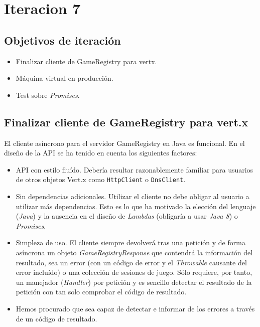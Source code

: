 \chapter{Iteracion 7}
\section{Objetivos de iteración}
\begin{itemize}
 \item Finalizar cliente de GameRegistry para vertx.
 \item Máquina virtual en producción.
 \item Test sobre \emph{Promises}.
\end{itemize}

 
\section{Finalizar cliente de GameRegistry para vert.x}
El cliente asíncrono para el servidor GameRegistry en Java 
es funcional. En el diseño de la API se ha tenido en
cuenta los siguientes factores:

\begin{itemize}
 \item API con estilo fluído. Debería resultar razonablemente 
       familiar para usuarios de otros objetos Vert.x como 
       \texttt{HttpClient} o \texttt{DnsClient}.
 \item Sin dependencias adicionales. Utilizar el cliente
       no debe obligar al usuario a utilizar más dependencias.
       Esto es lo que ha motivado la elección del lenguaje
       (\emph{Java}) y la ausencia en el diseño de 
       \emph{Lambdas} (obligaría a usar \emph{Java 8})
       o \emph{Promises}.
 \item Simpleza de uso. El cliente siempre devolverá 
       tras una petición y de forma asíncrona un objeto
       \emph{GameRegistryResponse} que contendrá la información
       del resultado, sea un error (con un código de error
       y el \emph{Throwable} causante del error incluído)
       o una colección de sesiones de juego. Sólo requiere,
       por tanto, un manejador (\emph{Handler}) por petición
       y es sencillo detectar el resultado de la petición
       con tan solo comprobar el código de resultado.
 \item Hemos procurado que sea capaz de detectar e informar
       de los errores a través de un código de resultado.
\end{itemize}

